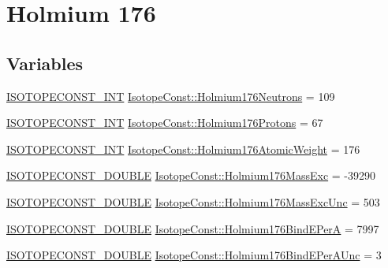 \hypertarget{group___isotope_const-_holmium-_ho176}{}\section{Holmium 176}
\label{group___isotope_const-_holmium-_ho176}
\subsection*{Variables}
\begin{DoxyCompactItemize}
\item 
\mbox{\hyperlink{group___isotope_const-_macros_ga5f18360b3e99483a35c32d789e62621c}{I\+S\+O\+T\+O\+P\+E\+C\+O\+N\+S\+T\+\_\+\+I\+NT}} \mbox{\hyperlink{group___isotope_const-_holmium-_ho176_ga415b1063ea0627bba649a01668f79547}{Isotope\+Const\+::\+Holmium176\+Neutrons}} = 109
\item 
\mbox{\hyperlink{group___isotope_const-_macros_ga5f18360b3e99483a35c32d789e62621c}{I\+S\+O\+T\+O\+P\+E\+C\+O\+N\+S\+T\+\_\+\+I\+NT}} \mbox{\hyperlink{group___isotope_const-_holmium-_ho176_gaebbb5aeb6eb7fdd4f5a4d672aee67f3a}{Isotope\+Const\+::\+Holmium176\+Protons}} = 67
\item 
\mbox{\hyperlink{group___isotope_const-_macros_ga5f18360b3e99483a35c32d789e62621c}{I\+S\+O\+T\+O\+P\+E\+C\+O\+N\+S\+T\+\_\+\+I\+NT}} \mbox{\hyperlink{group___isotope_const-_holmium-_ho176_ga2948c3f82cf0a093c38e3811ddda036e}{Isotope\+Const\+::\+Holmium176\+Atomic\+Weight}} = 176
\item 
\mbox{\hyperlink{group___isotope_const-_macros_ga8f45a7272ce02c0b4c65c44636ed719a}{I\+S\+O\+T\+O\+P\+E\+C\+O\+N\+S\+T\+\_\+\+D\+O\+U\+B\+LE}} \mbox{\hyperlink{group___isotope_const-_holmium-_ho176_ga6d79e63546f7efa18dce615c6081cc24}{Isotope\+Const\+::\+Holmium176\+Mass\+Exc}} = -\/39290
\item 
\mbox{\hyperlink{group___isotope_const-_macros_ga8f45a7272ce02c0b4c65c44636ed719a}{I\+S\+O\+T\+O\+P\+E\+C\+O\+N\+S\+T\+\_\+\+D\+O\+U\+B\+LE}} \mbox{\hyperlink{group___isotope_const-_holmium-_ho176_ga7e13bc0abddea644a9040772e4cf3daf}{Isotope\+Const\+::\+Holmium176\+Mass\+Exc\+Unc}} = 503
\item 
\mbox{\hyperlink{group___isotope_const-_macros_ga8f45a7272ce02c0b4c65c44636ed719a}{I\+S\+O\+T\+O\+P\+E\+C\+O\+N\+S\+T\+\_\+\+D\+O\+U\+B\+LE}} \mbox{\hyperlink{group___isotope_const-_holmium-_ho176_ga3112badc7bf314d9253bb06fc83b1dd7}{Isotope\+Const\+::\+Holmium176\+Bind\+E\+PerA}} = 7997
\item 
\mbox{\hyperlink{group___isotope_const-_macros_ga8f45a7272ce02c0b4c65c44636ed719a}{I\+S\+O\+T\+O\+P\+E\+C\+O\+N\+S\+T\+\_\+\+D\+O\+U\+B\+LE}} \mbox{\hyperlink{group___isotope_const-_holmium-_ho176_ga8dffb5e8dff4b1f6e514e56dc5d9751e}{Isotope\+Const\+::\+Holmium176\+Bind\+E\+Per\+A\+Unc}} = 3

\end{DoxyCompactItemize}
